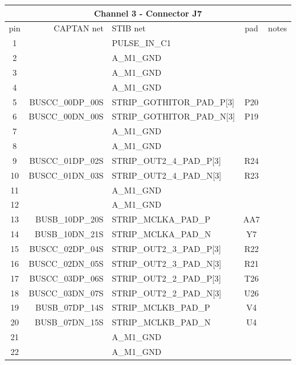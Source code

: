\documentclass[11pt]{article}
\begin{document}
\begin{table}
\begin{center}
\scriptsize
\begin{tabular}{|c|r|l|c|l|} \hline
\multicolumn{5}{|c|}{Channel 3 - Connector J7} \\ \hline
pin & CAPTAN net    & STIB net & pad & notes \\ \hline\hline
 1 &                 & PULSE\_IN\_C1             &  & \\
 2 &                 & A\_M1\_GND                &  & \\ \hline
 3 &                 & A\_M1\_GND                &  & \\
 4 &                 & A\_M1\_GND                &  & \\ \hline
 5 &  BUSCC\_00DP\_00S & STRIP\_GOTHITOR\_PAD\_P[3] & P20  & \\
 6 &  BUSCC\_00DN\_00S & STRIP\_GOTHITOR\_PAD\_N[3] & P19  & \\ \hline
 7 &                 & A\_M1\_GND                &  & \\
 8 &                 & A\_M1\_GND                &  & \\ \hline
 9 &  BUSCC\_01DP\_02S & STRIP\_OUT2\_4\_PAD\_P[3]   & R24  & \\
10 &  BUSCC\_01DN\_03S & STRIP\_OUT2\_4\_PAD\_N[3]   & R23  & \\ \hline
11 &                 & A\_M1\_GND                &  & \\
12 &                 & A\_M1\_GND                &  & \\ \hline
13 &   BUSB\_10DP\_20S & STRIP\_MCLKA\_PAD\_P       & AA7  & \\
14 &   BUSB\_10DN\_21S & STRIP\_MCLKA\_PAD\_N       & Y7   & \\ \hline
15 &  BUSCC\_02DP\_04S & STRIP\_OUT2\_3\_PAD\_P[3]   & R22 & \\
16 &  BUSCC\_02DN\_05S & STRIP\_OUT2\_3\_PAD\_N[3]   & R21 & \\ \hline
17 &  BUSCC\_03DP\_06S & STRIP\_OUT2\_2\_PAD\_P[3]   & T26 & \\
18 &  BUSCC\_03DN\_07S & STRIP\_OUT2\_2\_PAD\_N[3]   & U26 & \\ \hline
19 &   BUSB\_07DP\_14S & STRIP\_MCLKB\_PAD\_P       & V4 & \\
20 &   BUSB\_07DN\_15S & STRIP\_MCLKB\_PAD\_N       & U4 & \\ \hline
21 &                 & A\_M1\_GND                & & \\
22 &                 & A\_M1\_GND                & & \\ \hline

\end{tabular}
\end{center}
\end{table}
\end{document}
